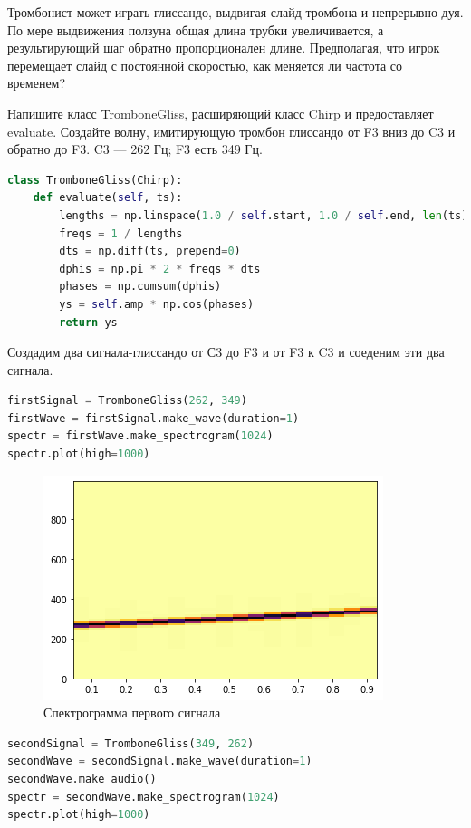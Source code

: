 Тромбонист может играть глиссандо, выдвигая слайд тромбона и непрерывно дуя. По мере выдвижения ползуна общая длина трубки увеличивается, а результирующий шаг обратно пропорционален длине.
Предполагая, что игрок перемещает слайд с постоянной скоростью, как меняется ли частота со временем?

\noindent Напишите класс TromboneGliss, расширяющий класс Chirp и предоставляет evaluate. Создайте волну, имитирующую тромбон глиссандо от F3 вниз до C3 и обратно до F3. C3 — 262 Гц; F3 есть 349 Гц.

\begin{lstlisting}[language=Python]
class TromboneGliss(Chirp): 
    def evaluate(self, ts):
        lengths = np.linspace(1.0 / self.start, 1.0 / self.end, len(ts))
        freqs = 1 / lengths
        dts = np.diff(ts, prepend=0)
        dphis = np.pi * 2 * freqs * dts
        phases = np.cumsum(dphis)
        ys = self.amp * np.cos(phases)
        return ys
\end{lstlisting}

Создадим два сигнала-глиссандо от С3 до F3 и от F3 к C3 и соеденим эти два сигнала.

\begin{lstlisting}[language=Python]
firstSignal = TromboneGliss(262, 349)
firstWave = firstSignal.make_wave(duration=1)
spectr = firstWave.make_spectrogram(1024)
spectr.plot(high=1000)
\end{lstlisting}
\begin{figure}[H]
	\begin{center}
		\includegraphics[scale=1]{fig/lab03/lab03_7.png}
		\caption{Спектрограмма первого сигнала}
	\end{center}
\end{figure}

\begin{lstlisting}[language=Python]
secondSignal = TromboneGliss(349, 262)
secondWave = secondSignal.make_wave(duration=1)
secondWave.make_audio()
spectr = secondWave.make_spectrogram(1024)
spectr.plot(high=1000)
\end{lstlisting}

